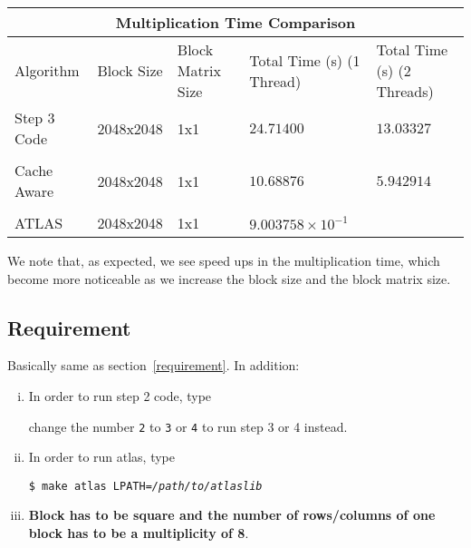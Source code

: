 \documentclass[12pt]{article}
\newcommand{\0}{\mathbf{0}}
\begin{document}
	
	
	\begin{center}
		
		\begin{tabular}{ |p{2cm}| |p{2cm}| |p{2cm}||p{3cm}||p{3cm}|}
			\hline
			\multicolumn{5}{|c|}{Multiplication Time Comparison } \\
			\hline
			Algorithm& Block Size &Block Matrix Size & Total Time (s) (1 Thread)& Total Time (s) (2 Threads)\\
			\hline
			Step 3 Code & 2048x2048 &  1x1 & $24.71400$  & $13.03327$    \\
			&  &  & & \\
			
			Cache Aware & 2048x2048& 1x1 &  $10.68876$ & $5.942914$   \\ 
			
			& & & & \\
			
			ATLAS & 2048x2048 & 1x1 & $9.003758\times10^{-1}$&  \\
			
			
			\hline
		\end{tabular}
		
	\end{center}
	
	
	We note that, as expected, we see speed ups in the multiplication time, which become more noticeable as we increase the block size and the block matrix size.
	
	\subsection{Requirement}
	Basically same as section~\ref{requirement}. In addition:
	\begin{enumerate}[(i)]
	  \item In order to run step 2 code, type

	    {\par}

	    change the number \texttt{2} to \texttt{3} or \texttt{4} to run step 3 or 4 instead.
	  \item In order to run atlas, type

	    {\centering \texttt{\$ make atlas LPATH=\textit{/path/to/atlaslib}}\par}

	  \item \textbf{Block has to be square and the number of rows/columns of one block has to be a multiplicity of 8}.
	\end{enumerate}
\end{document}
